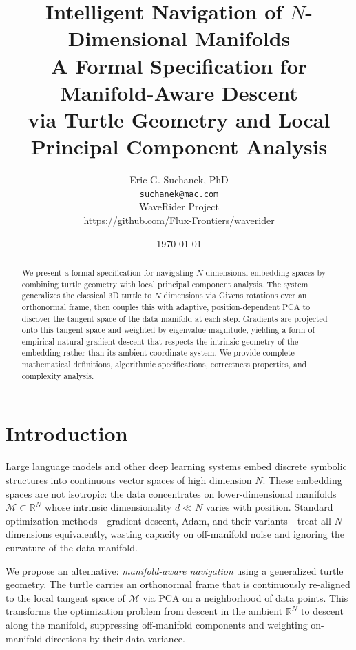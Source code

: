 \documentclass[11pt,letterpaper]{article}
\title{%
  \textbf{Intelligent Navigation of $N$-Dimensional Manifolds} \\[6pt]
  \large A Formal Specification for Manifold-Aware Descent \\
  via Turtle Geometry and Local Principal Component Analysis
}
\author{
  Eric G. Suchanek, PhD \\
  \texttt{suchanek@mac.com} \\[4pt]
  WaveRider Project \\
  \url{https://github.com/Flux-Frontiers/waverider}
}
\date{\today}
\newcommand{\R}{\mathbb{R}}
\newcommand{\manifold}{\mathcal{M}}
\begin{document}
\maketitle

\begin{abstract}
We present a formal specification for navigating $N$-dimensional embedding
spaces by combining turtle geometry with local principal component analysis.
The system generalizes the classical 3D turtle to $N$ dimensions via Givens
rotations over an orthonormal frame, then couples this with adaptive,
position-dependent PCA to discover the tangent space of the data manifold
at each step. Gradients are projected onto this tangent space and weighted
by eigenvalue magnitude, yielding a form of empirical natural gradient
descent that respects the intrinsic geometry of the embedding rather than
its ambient coordinate system. We provide complete mathematical definitions,
algorithmic specifications, correctness properties, and complexity analysis.
\end{abstract}

\tableofcontents
\newpage

\section{Introduction}
\label{sec:intro}

Large language models and other deep learning systems embed discrete
symbolic structures into continuous vector spaces of high dimension $N$.
These embedding spaces are not isotropic: the data concentrates on
lower-dimensional manifolds $\manifold \subset \R^N$ whose intrinsic
dimensionality $d \ll N$ varies with position. Standard optimization
methods---gradient descent, Adam, and their variants---treat all $N$
dimensions equivalently, wasting capacity on off-manifold noise and
ignoring the curvature of the data manifold.

We propose an alternative: \emph{manifold-aware navigation} using a
generalized turtle geometry. The turtle carries an orthonormal frame
that is continuously re-aligned to the local tangent space of $\manifold$
via PCA on a neighborhood of data points. This transforms the optimization
problem from descent in the ambient $\R^N$ to descent along the manifold,
suppressing off-manifold components and weighting on-manifold directions
by their data variance.
\end{document}
